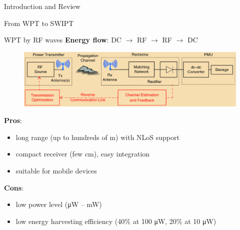 \documentclass[9pt]{beamer}
\begin{document}
\begin{section}{Introduction and Review}
\begin{subsection}{From WPT to SWIPT}
		\begin{frame}{WPT by RF waves}
			\textbf{Energy flow}: DC $\to$ RF $\to$ RF $\to$ DC
			\begin{figure}
				\centering
				\includegraphics[width=\textwidth]{assets/wpt.eps}
			\end{figure}
			\textbf{Pros}:
			\begin{itemize}
				\item long range (up to hundreds of \si{\m}) with NLoS support
				\item compact receiver (few \si{\cm}), easy integration
				\item suitable for mobile devices
			\end{itemize}
			\textbf{Cons}:
			\begin{itemize}
				\item low power level (\si{\uW} -- \si{\mW})
				\item low energy harvesting efficiency (40\% at 100 \si{\uW}, 20\% at 10 \si{\uW})
			\end{itemize}
		\end{frame}
	\end{subsection}
\end{section}
\end{document}
